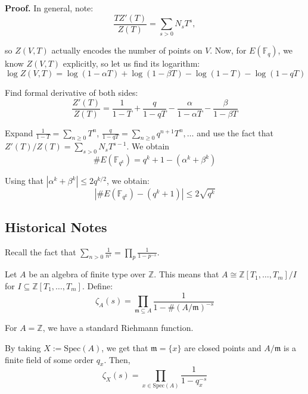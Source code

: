\documentclass{template}
\begin{document}
\textbf{Proof.} In general, note:
\begin{equation*}
    \frac{TZ'(T)}{Z(T)} = \sum_{s > 0}N_sT^s,
\end{equation*}

so $Z(V,T)$ actually encodes the number of points on $V$. Now, for 
$E(\mathbb{F}_q)$, we know $Z(V,T)$ explicitly, so let us find its logarithm:
\begin{equation*}
    \log Z(V,T) = \log(1-\alpha T) + \log(1-\beta T) - \log(1-T) - \log(1-qT)
\end{equation*}

Find formal derivative of both sides:
\begin{equation*}
    \frac{Z'(T)}{Z(T)} = \frac{1}{1-T} + \frac{q}{1-qT} - \frac{\alpha}{1-\alpha T} - \frac{\beta}{1-\beta T}
\end{equation*}

Expand $\frac{1}{1-T}=\sum_{n \geq 0}T^n$, $\frac{q}{1-qT} = \sum_{n \geq 0}q^{n+1}T^n, \dots$ and 
use the fact that $Z'(T)/Z(T) = \sum_{s > 0}N_{s}T^{s-1}$.
We obtain
\begin{equation*}
    \#E(\mathbb{F}_{q^k}) = q^k + 1 - (\alpha^k + \beta^k)
\end{equation*}

Using that $|\alpha^k + \beta^k| \leq 2q^{k/2}$, we obtain:
\begin{equation*}
    |\#E(\mathbb{F}_{q^k}) - (q^k+1)| \leq 2\sqrt{q^k}
\end{equation*}

\subsection{Historical Notes}

Recall the fact that $\sum_{n>0}\frac{1}{n^s} = \prod_{p}\frac{1}{1-p^{-s}}$.

\begin{definition}
    Let $A$ be an algebra of finite type over $\mathbb{Z}$. This means that $A
    \cong \mathbb{Z}[T_1,\dots,T_m]/I$ for $I \subseteq
    \mathbb{Z}[T_1,\dots,T_m]$. Define:
    \begin{equation*}
        \zeta_A(s) = \prod_{\mathfrak{m} \subseteq A} \frac{1}{1-\#(A/\mathfrak{m})^{-s}}
    \end{equation*}
\end{definition}

\begin{example}
    For $A=\mathbb{Z}$, we have a standard Riehmann function.

    By taking $X := \text{Spec}(A)$, we get that $\mathfrak{m}=\{x\}$ are closed
    points and $A/\mathfrak{m}$ is a finite field of some order $q_x$. Then,
    \begin{equation*}
        \zeta_X(s) = \prod_{x \in \text{Spec}(A)}\frac{1}{1-q_x^{-s}}
    \end{equation*}
\end{example}
\end{document}
